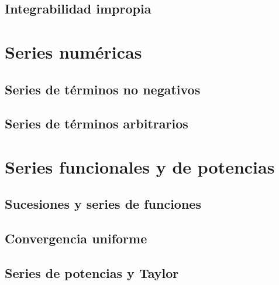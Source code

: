 \documentclass{article}
\begin{document}
\subsection{Integrabilidad impropia}





\section{Series numéricas}

\subsection{Series de términos no negativos}

\subsection{Series de términos arbitrarios}





\section{Series funcionales y de potencias}

\subsection{Sucesiones y series de funciones}

\subsection{Convergencia uniforme}

\subsection{Series de potencias y Taylor}
\end{document}
